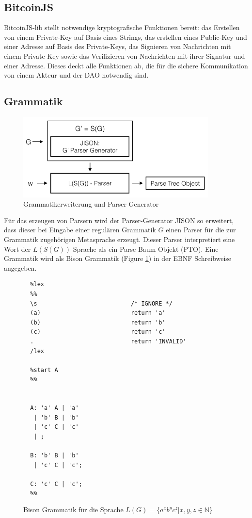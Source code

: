 \documentclass[a4paper,12pt]{report}
\begin{document}
\subsection*{BitcoinJS}
BitcoinJS-lib stellt notwendige kryptografische Funktionen bereit: das Erstellen von einem Private-Key auf Basis eines Strings, das erstellen eines Public-Key und einer Adresse auf Basis des Private-Keys, das Signieren von Nachrichten mit einem Private-Key sowie das Verifizieren von Nachrichten mit ihrer Signatur und einer Adresse. Dieses deckt alle Funktionen ab, die für die sichere Kommunikation von einem Akteur und der DAO notwendig sind.

\subsection*{Grammatik}
\begin{figure}[ht]
    \centering
    \includegraphics[width=0.90\textwidth]{bilder/parsergenerator.png}
    \caption{Grammatikerweiterung und Parser Generator}
\end{figure}

Für das erzeugen von Parsern wird der Parser-Generator JISON so erweitert, dass dieser bei Eingabe einer regulären Grammatik $G$ einen Parser für die zur Grammatik zugehörigen Metasprache erzeugt. Dieser Parser interpretiert eine Wort der $L(S(G))$ Sprache als ein Parse Baum Objekt (PTO). Eine Grammatik wird als Bison Grammatik (Figure \ref{bisongrammar}) in der EBNF Schreibweise angegeben.

\begin{figure}[ht]
  \centering
  \begin{lstlisting}
  %lex
  %%
  \s                           /* IGNORE */
  (a)                          return 'a'
  (b)                          return 'b'
  (c)                          return 'c'
  .                            return 'INVALID'
  /lex

  %start A
  %% 


  A: 'a' A | 'a'
   | 'b' B | 'b'
   | 'c' C | 'c'
   | ;

  B: 'b' B | 'b'
   | 'c' C | 'c';

  C: 'c' C | 'c';
  %%
  \end{lstlisting}
  \caption{ Bison Grammatik für die Sprache $L(G) = \{ a^xb^yc^z | x,y,z\in \mathbb{N} \}$ }
  \label{bisongrammar}
\end{figure}
\end{document}
